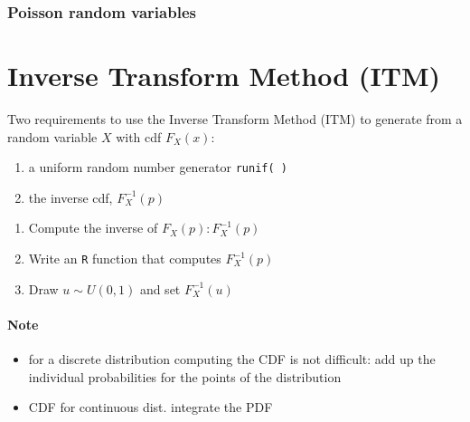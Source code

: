 \documentclass[
  letterpaper,
  DIV=11,
  numbers=noendperiod]{scrreprt}
\begin{document}
\subsection{Poisson random variables}\label{poisson-random-variables}

\chapter{Inverse Transform Method
(ITM)}\label{inverse-transform-method-itm}

Two requirements to use the Inverse Transform Method (ITM) to generate
from a random variable \(X\) with cdf \(F_X(x)\):

\begin{enumerate}
\def\labelenumi{\arabic{enumi}.}
\item
  a uniform random number generator \texttt{runif(\ )}
\item
  the inverse cdf, \(F^{−1}_X(p)\)
\end{enumerate}

\begin{tcolorbox}[enhanced jigsaw, bottomrule=.15mm, leftrule=.75mm, colbacktitle=quarto-callout-tip-color!10!white, toptitle=1mm, opacityback=0, titlerule=0mm, colback=white, title=\textcolor{quarto-callout-tip-color}{\faLightbulb}\hspace{0.5em}{Steps}, opacitybacktitle=0.6, left=2mm, rightrule=.15mm, breakable, bottomtitle=1mm, arc=.35mm, coltitle=black, toprule=.15mm, colframe=quarto-callout-tip-color-frame]

\begin{enumerate}
\def\labelenumi{\arabic{enumi}.}
\item
  Compute the inverse of \(F_X(p):F^{−1}_X(p)\)
\item
  Write an \texttt{R} function that computes \(F^{−1}_X(p)\)
\item
  Draw \(u \sim U(0, 1)\) and set \(F^{−1}_X(u)\)
\end{enumerate}

\end{tcolorbox}

\subsubsection{Note}\label{note}

\begin{itemize}
\item
  for a discrete distribution computing the CDF is not difficult: add up
  the individual probabilities for the points of the distribution
\item
  CDF for continuous dist. integrate the PDF
\end{itemize}
\end{document}
